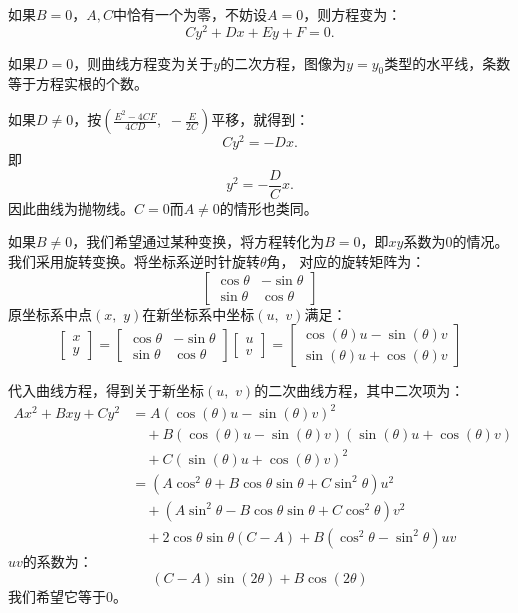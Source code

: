 \documentclass[12pt,UTF8]{ctexbook}
\theoremstyle{definition}
\theoremstyle{plain}
\begin{document}
如果$B = 0$，$A,C$中恰有一个为零，不妨设$A = 0$，则方程变为：
$$ Cy^2 + Dx + Ey + F = 0.$$

如果$D = 0$，则曲线方程变为关于$y$的二次方程，图像为$y = y_0$类型的水平线，条数等于方程实根的个数。

如果$D\neq 0$，按$\displaystyle\left(\frac{E^2 - 4CF}{4CD},\,\,-\frac{E}{2C}\right)$平移，就得到：
$$ Cy^2 = -Dx. $$
即
$$ y^2 = -\frac{D}{C}x. $$
因此曲线为抛物线。$C=0$而$A\neq 0$的情形也类同。

如果$B\neq 0$，我们希望通过某种变换，将方程转化为$B = 0$，即$xy$系数为$0$的情况。我们采用旋转变换。将坐标系逆时针旋转$\theta$角，
对应的旋转矩阵为：
$$
\begin{bmatrix}
    \cos{\theta} & -\sin{\theta} \\
    \sin{\theta} & \cos{\theta} 
\end{bmatrix}
$$
原坐标系中点$(x,\,\,y)$在新坐标系中坐标$(u,\,\,v)$满足：
$$
\begin{bmatrix}
    x \\ y
\end{bmatrix}
=
\begin{bmatrix}
    \cos{\theta} & -\sin{\theta} \\
    \sin{\theta} & \cos{\theta} 
\end{bmatrix}
\begin{bmatrix}
    u \\ v
\end{bmatrix}
= 
\begin{bmatrix}
    \cos{(\theta)}u - \sin{(\theta)}v \\ \sin{(\theta)}u + \cos{(\theta)}v
\end{bmatrix}
$$


代入曲线方程，得到关于新坐标$(u,\,\,v)$的二次曲线方程，其中二次项为：
\begin{align*}
    Ax^2 + Bxy + Cy^2 &= A(\cos{(\theta)}u - \sin{(\theta)}v)^2 \\
    &\quad + B(\cos{(\theta)}u - \sin{(\theta)}v)(\sin{(\theta)}u + \cos{(\theta)}v) \\
    &\quad + C(\sin{(\theta)}u + \cos{(\theta)}v)^2 \\
    &= (A\cos^2{\theta} + B\cos{\theta}\sin{\theta} + C\sin^2{\theta})u^2 \\
    &\quad + (A\sin^2{\theta} - B\cos{\theta}\sin{\theta} + C\cos^2{\theta})v^2 \\
    &\quad + 2\cos{\theta}\sin{\theta}(C - A) + B(\cos^2{\theta} - \sin^2{\theta})uv
\end{align*}
$uv$的系数为：
$$ (C - A)\sin{(2\theta)} + B\cos{(2\theta)} $$
我们希望它等于$0$。
\end{document}
